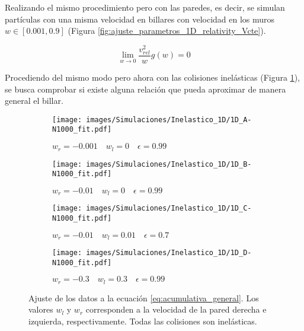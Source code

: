Realizando el mismo procedimiento pero con las paredes, es decir, se simulan partículas con una misma velocidad en billares con velocidad en los muros \( w \in [0.001, 0.9] \) (Figura \ref{fig:ajuste_parametros_1D_relativity_Vcte}). 

\begin{equation}
    \lim_{w\rightarrow 0} \dfrac{v^2_{rel}}{w}g(w) = 0
\end{equation}


\vspace{3mm}

Procediendo del mismo modo pero ahora con las colisiones inelásticas (Figura \ref{fig:ajuste_1D_inelastic}), se busca comprobar si existe alguna relación que pueda aproximar de manera general el billar. 

\begin{figure}[H]
    \begin{subfigure}[b]{0.5\textwidth}
        \centering
        \texttt{[image: images/Simulaciones/Inelastico\_1D/1D\_A-N1000\_fit.pdf]}
        \caption{$w_r = -0.001 \quad w_l = 0 \quad \epsilon = 0.99$}
    \end{subfigure}
    \hfill
    \begin{subfigure}[b]{0.5\textwidth}
        \centering
        \texttt{[image: images/Simulaciones/Inelastico\_1D/1D\_B-N1000\_fit.pdf]}
        \caption{$w_r = -0.01 \quad w_l = 0 \quad \epsilon = 0.99$}
    \end{subfigure}
    \hfill
    \begin{subfigure}[b]{0.5\textwidth}
        \centering
        \texttt{[image: images/Simulaciones/Inelastico\_1D/1D\_C-N1000\_fit.pdf]}
        \caption{$w_r = -0.01 \quad w_l = 0.01 \quad \epsilon = 0.7$}
    \end{subfigure}
    \hfill
    \begin{subfigure}[b]{0.5\textwidth}
        \centering
        \texttt{[image: images/Simulaciones/Inelastico\_1D/1D\_D-N1000\_fit.pdf]}
        \caption{$w_r = -0.3 \quad w_l = 0.3 \quad \epsilon = 0.99$}
    \end{subfigure}
    \caption{Ajuste de los datos a la ecuación \ref{eq:acumulativa_general}. Los valores \( w_l \) y \( w_r \) corresponden a la velocidad de la pared derecha e izquierda, respectivamente. Todas las colisiones son  inelásticas.}
    \label{fig:ajuste_1D_inelastic}
\end{figure}

